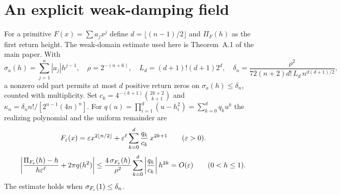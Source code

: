 \documentclass[11pt]{article}
\renewcommand{\thesection}{S\arabic{section}}
\begin{document}



\appendix
\renewcommand{\thesection}{S\Alph{section}}
\section{An explicit weak-damping field}\label{sec:weak}
For a primitive $F(x)=\sum a_jx^j$ define $d=\lfloor(n-1)/2\rfloor$
and $\Pi_F(h)$ as the first return height. The weak-domain estimate used
here is Theorem~A.1 of the main paper. With
\begin{equation}\label{eq:weak-defs}
  \sigma_a(h)=\sum_{j=1}^n |a_j|h^{j-1},\quad
  \rho=2^{-(n+6)},\quad
  L_d=(d+1)!(d+1)2^d,\quad
  \delta_n=\frac{\rho^2}{72(n+2)d!\,L_d\,n^{d(d+1)/2}},
\end{equation}
a nonzero odd part permits at most $d$ positive return zeros on
$\sigma_a(h)\le\delta_n$, counted with multiplicity. Set
$c_k=4^{-(k+1)}\binom{2k+2}{k+1}$ and
$\kappa_n=\delta_n n!/[2^{n-1}(4n)^n]$.
For $q(u)=\prod_{i=1}^d(u-h_i^2)=\sum_{k=0}^dq_k u^k$ the realizing
polynomial and the uniform remainder are
\begin{equation}\label{eq:weak-realize}
  F_\varepsilon(x) = \varepsilon x^{2\lfloor n/2\rfloor} + \varepsilon^\ell\sum_{k=0}^d \frac{q_k}{c_k}\,x^{2k+1}\qquad (\varepsilon>0).
\end{equation}
\begin{equation}\label{eq:weak-cauchy-err}
  \left|\frac{\Pi_{F_\varepsilon}(h)-h}{h\varepsilon^\ell} + 2\pi q(h^2)\right| \le \frac{4\,\sigma_{F_\varepsilon}(h)}{\rho^2}\sum_{k=0}^d\left|\frac{q_k}{c_k}\right|h^{2k} = O(\varepsilon)\qquad (0<h\le 1).
\end{equation}
The estimate holds when $\sigma_{F_\varepsilon}(1)\le\delta_n$.




\end{document}

